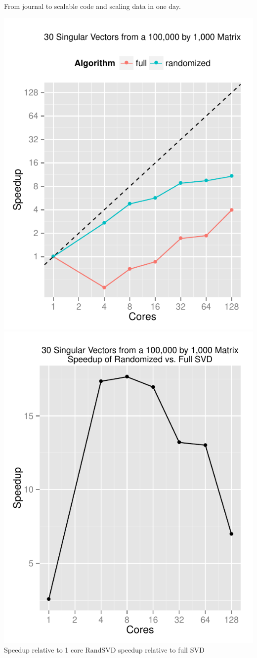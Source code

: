 \begin{frame}
  \begin{block}{From journal to scalable code and scaling data in one day.}
    \begin{center}
      \includegraphics[width=.4\textwidth]{../common/pics/randsvd/randSVDspeedup}
      \hspace{1cm}
      \includegraphics[width=.4\textwidth]{../common/pics/randsvd/randSpeedupSVD}
      \\ \scriptsize
Speedup relative to 1 core \hspace{2.5cm} RandSVD speedup relative to full SVD
    \end{center}
  \end{block}
\end{frame}
